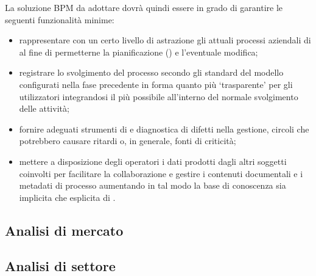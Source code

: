 La soluzione BPM da adottare dovrà quindi essere in grado di garantire le seguenti funzionalità minime:
\begin{itemize}
  \item rappresentare con un certo livello di astrazione gli attuali processi aziendali di \customer al fine di permetterne la pianificazione (\bsn {}) e l'eventuale modifica;
  \item registrare lo svolgimento del processo secondo gli standard del modello configurati nella fase precedente in forma quanto più `trasparente' per gli utilizzatori integrandosi il più possibile all'interno del normale svolgimento delle attività;
  \item fornire adeguati strumenti di  e diagnostica di difetti nella gestione, circoli che potrebbero causare ritardi o, in generale, fonti di criticità;
  \item mettere a disposizione degli operatori i dati prodotti dagli altri soggetti coinvolti per facilitare la collaborazione e gestire i contenuti documentali e i metadati di processo aumentando in tal modo la base di conoscenza sia implicita che esplicita di \customer.
\end{itemize}


\subsection{Analisi di mercato}

\subsection{Analisi di settore}
